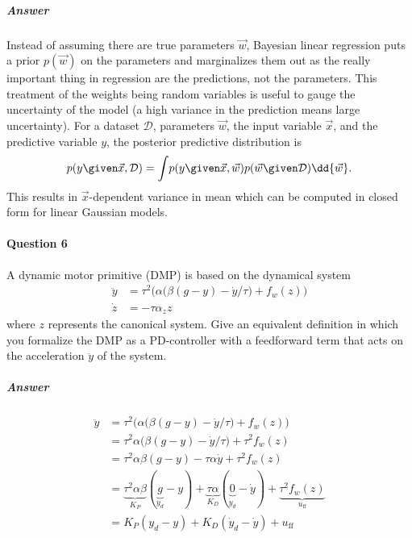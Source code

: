 		\subparagraph{Answer}
			Instead of assuming there are true parameters \(\vec{w}\), Bayesian linear regression puts a prior \(p(\vec{w})\) on the parameters and marginalizes them out as the really important thing in regression are the predictions, not the parameters. This treatment of the weights being random variables is useful to gauge the uncertainty of the model (a high variance in the prediction means large uncertainty). For a dataset \(\mathcal{D}\), parameters \(\vec{w}\), the input variable \(\vec{x}\), and the predictive variable \(y\), the posterior predictive distribution is
			\begin{equation*}
				p(y \given \vec{x}, \mathcal{D}) = \int\! p(y \given \vec{x}, \vec{w}) p(\vec{w} \given \mathcal{D}) \dd{\vec{w}}.
			\end{equation*}
			This results in \(\vec{x}\)-dependent variance in mean which can be computed in closed form for linear Gaussian models.

	\paragraph{Question 6}
		A dynamic motor primitive (DMP) is based on the dynamical system
		\begin{align*}
			\ddot{y} & = \tau^2 \Big( \alpha \big( \beta (g - y) - \dot{y} / \tau \big) + f_w(z) \Big) \\
			\dot{z}  & = -\tau \alpha_z z
		\end{align*}
		where \(z\) represents the canonical system. Give an equivalent definition in which you formalize the DMP as a PD-controller with a feedforward term that acts on the acceleration \(\ddot{y}\) of the system.

		\subparagraph{Answer}
			\begin{align*}
				\ddot{y}
				 & = \tau^2 \Big( \alpha \big( \beta (g - y) - \dot{y} / \tau \big) + f_w(z) \Big)                                                                                                          \\
				 & = \tau^2 \alpha \big( \beta (g - y) - \dot{y} / \tau \big) + \tau^2 f_w(z)                                                                                                               \\
				 & = \tau^2 \alpha \beta (g - y) - \tau \alpha \dot{y} + \tau^2 f_w(z)                                                                                                                      \\
				 & = \underbrace{\tau^2 \alpha \beta}_{K_P} (\underbrace{g}_{y_d} - y) + \underbrace{\tau \alpha}_{K_D} (\underbrace{0}_{\dot{y}_d} - \dot{y}) + \underbrace{\tau^2 f_w(z)}_{u_\mathrm{ff}} \\
				 & = K_P (y_d - y) + K_D (\dot{y}_d - \dot{y}) + u_\mathrm{ff}
			\end{align*}


